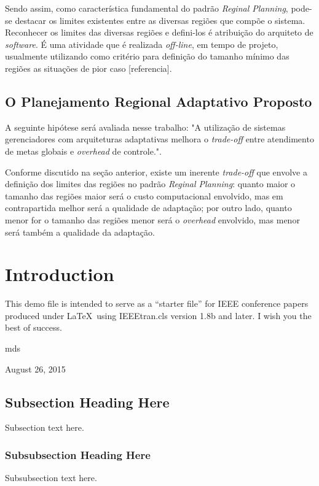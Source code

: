 \documentclass[conference]{IEEEtran}
\begin{document}
Sendo assim, como característica fundamental do padrão \textit{Reginal Planning}, pode-se destacar os limites existentes entre as diversas regiões que compõe o sistema. Reconhecer os limites das diversas regiões e defini-los é atribuição do arquiteto de \textit{software}. É uma atividade que é realizada \textit{off-line}, em tempo de projeto, usualmente utilizando como critério para definição do tamanho mínimo das regiões as situações de pior caso [referencia].

\subsection{O Planejamento Regional Adaptativo Proposto}

A seguinte hipótese será avaliada nesse trabalho: "A utilização de sistemas gerenciadores com arquiteturas adaptativas melhora o \textit{trade-off} entre atendimento de metas globais e \textit{overhead} de controle.".

Conforme discutido na seção anterior, existe um inerente \textit{trade-off} que envolve a definição dos limites das regiões no padrão \textit{Reginal Planning}: quanto maior o tamanho das regiões maior será o custo computacional envolvido, mas em contrapartida melhor será a qualidade de adaptação; por outro lado, quanto menor for o tamanho das regiões menor será o \textit{overhead} envolvido, mas menor será também a qualidade da adaptação.




\section{Introduction}
This demo file is intended to serve as a ``starter file''
for IEEE conference papers produced under \LaTeX\ using
IEEEtran.cls version 1.8b and later.
I wish you the best of success.

\hfill mds
 
\hfill August 26, 2015

\subsection{Subsection Heading Here}
Subsection text here.


\subsubsection{Subsubsection Heading Here}
Subsubsection text here.
\end{document}
